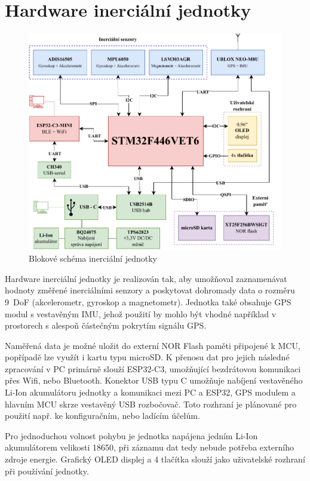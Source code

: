 \chapter{Hardware inerciální jednotky}

\begin{figure}[h]
    \centering
    \includegraphics[width=\textwidth]{obrazky/IMUnav_H00_block}
    \caption{Blokové schéma inerciální jednotky}
\end{figure}

Hardware inerciální jednotky je realizován tak, aby umožňoval zaznamenávat hodnoty změřené inerciálními senzory a poskytovat dohromady data o rozměru 9~\ac{DoF} (akcelerometr, gyroskop a magnetometr). Jednotka také obsahuje \ac{GPS} modul s vestavěným \ac{IMU}, jehož použití by mohlo být vhodné například v prostorech s alespoň částečným pokrytím signálu \ac{GPS}.

Naměřená data je možné uložit do externí NOR Flash paměti připojené k \ac{MCU}, popřípadě lze využít i kartu typu microSD. K přenosu dat pro jejich následné zpracování v PC primárně slouží ESP32-C3, umožňující bezdrátovou komunikaci přes Wifi, nebo Bluetooth. Konektor \ac{USB} typu C umožňuje nabíjení vestavěného Li-Ion akumulátoru jednotky a komunikaci mezi PC a ESP32, \ac{GPS} modulem a hlavním \ac{MCU} skrze vestavěný \ac{USB} rozbočovač. Toto rozhraní je plánované pro použití např. ke konfiguračním, nebo ladícím účelům.

Pro jednoduchou volnost pohybu je jednotka napájena jedním Li-Ion akumulátorem velikosti 18650, při záznamu dat tedy nebude potřeba externího zdroje energie. Grafický \ac{OLED} displej a 4 tlačítka slouží jako uživatelské rozhraní při používání jednotky.

